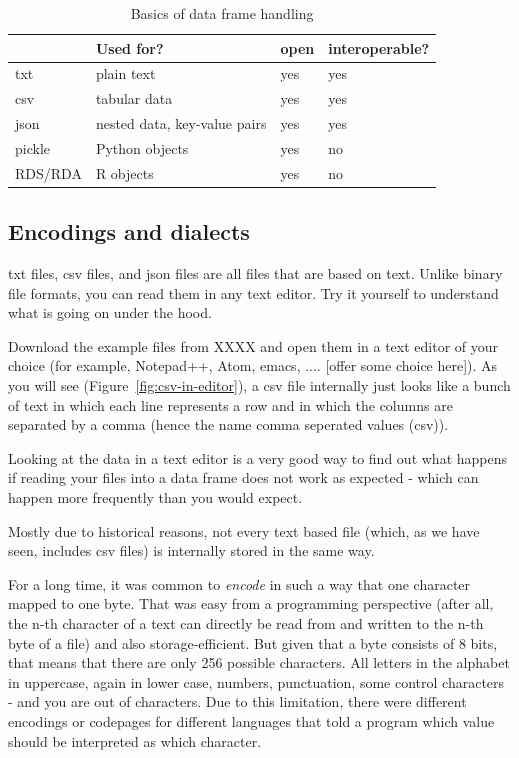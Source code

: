 \begin{table}[]
\caption{Basics of data frame handling}
\label{tab:fileformats}
\begin{tabular}{@{}llll@{}}
\toprule
        & Used for?             & open   & interoperable?\\ \midrule
txt     & plain text            &yes & yes            \\
csv     & tabular data          & yes & yes            \\
json    & nested data, key-value pairs   & yes & yes             \\ 
pickle  & Python objects        & yes & no     \\ 
RDS/RDA & R objects             & yes & no \\ \bottomrule
\end{tabular}
\end{table}


\subsection{Encodings and dialects}
txt files, csv files, and json files are all files that are based on text. Unlike binary file formats, you can read them in any text editor. Try it yourself to understand what is going on under the hood. 

Download the example files from XXXX and open them in a text editor of your choice (for example, Notepad++, Atom, emacs, .... [offer some choice here]). 
As you will see (Figure~\ref{fig:csv-in-editor}), a csv file internally just looks like a bunch of text in which each line represents a row and in which the columns are separated by a comma (hence the name comma seperated values (csv)).

Looking at the data in a text editor is a very good way to find out what happens if reading your files into a data frame does not work as expected - which can happen more frequently than you would expect.

Mostly due to historical reasons, not every text based file (which, as we have seen, includes csv files) is internally stored in the same way.

For a long time, it was common to \emph{encode} in such a way that one character mapped to one byte. That was easy from a programming perspective (after all, the n-th character of a text can directly be read from and written to the n-th byte of a file) and also storage-efficient. But given that a byte consists of 8 bits, that means that there are only 256 possible characters. All letters in the alphabet in uppercase, again in lower case, numbers, punctuation, some control characters - and you are out of characters. Due to this limitation, there were different encodings or codepages for different languages that told a program which value should be interpreted as which character.

